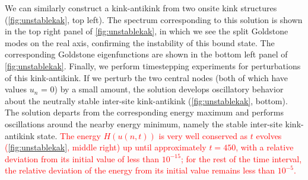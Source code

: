 \documentclass[12pt,reqno]{amsart}
\newcommand{\revised}[1]{ \textcolor{red}{#1} }
\begin{document}
We can similarly construct a kink-antikink from two onsite kink structures (\cref{fig:unstablekak}, top left). The spectrum corresponding to this solution is shown in the top right panel of \cref{fig:unstablekak}, in which we see the split Goldstone modes on the real axis, confirming the instability of
this bound state. The corresponding Goldstone eigenfunctions are shown in the bottom left panel of \cref{fig:unstablekak}. Finally, we perform timestepping experiments for perturbations of this kink-antikink. If we perturb the two central nodes (both of which have values $u_n$ = 0) by a small amount, the solution develops oscillatory behavior about the neutrally stable inter-site kink-antikink (\cref{fig:unstablekak}, bottom). The solution departs from the corresponding energy
maximum and performs oscillations around the nearby
energy minimum, namely the stable inter-site kink-antikink
state. \revised{The energy $H(u(n, t))$ is very well conserved as $t$ evolves (\cref{fig:unstablekak}, middle right) up until approximately $t = 450$, with a relative deviation from its initial value of less than $10^{-15}$; for the rest of the time interval, the relative deviation of the energy from its initial value remains less than $10^{-5}$.}
\end{document}
